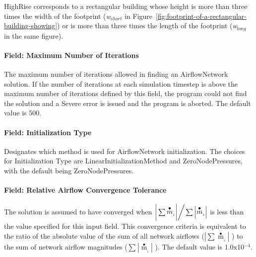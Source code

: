 HighRise corresponds to a rectangular building whose height is more than three times the width of the footprint (\emph{w\(_{short}\)} in Figure~\ref{fig:footprint-of-a-rectangular-building-showing}) or is more than three times the length of the footprint (\emph{w\(_{long}\)} in the same figure).

\paragraph{Field: Maximum Number of Iterations}\label{field-maximum-number-of-iterations}

The maximum number of iterations allowed in finding an AirflowNetwork solution. If the number of iterations at each simulation timestep is above the maximum number of iterations defined by this field, the program could not find the solution and a Severe error is issued and the program is aborted. The default value is 500.

\paragraph{Field: Initialization Type}\label{field-initialization-type}

Designates which method is used for AirflowNetwork initialization. The choices for Initialization Type are LinearInitializationMethod and ZeroNodePressures, with the default being ZeroNodePressures.

\paragraph{Field: Relative Airflow Convergence Tolerance}\label{field-relative-airflow-convergence-tolerance}

The solution is assumed to have converged when \({{\left| {\,\sum\limits_{} {{{\mathop m\limits^ \bullet }_{_i}}} } \right|} \mathord{\left/ {\vphantom {{\left| {\,\sum\limits_{} {{{\mathop m\limits^ \bullet }_{_i}}} } \right|} {\sum\limits_{} {\left| {{{\mathop m\limits^ \bullet }_{_i}}} \right|} }}} \right. } {\sum\limits_{} {\left| {{{\mathop m\limits^ \bullet }_{_i}}} \right|} }}\) is less than the value specified for this input field. This convergence criteria is equivalent to the ratio of the absolute value of the sum of all network airflows (\(\left| {\sum {{{\mathop m\limits^ \bullet }_{_i}}} } \right|\) ) to the sum of network airflow magnitudes (\(\sum\limits_{}^{} {\left| {{{\mathop m\limits^ \bullet }_{_i}}} \right|}\) ). The default value is 1.0x10\(^{-4}\).

